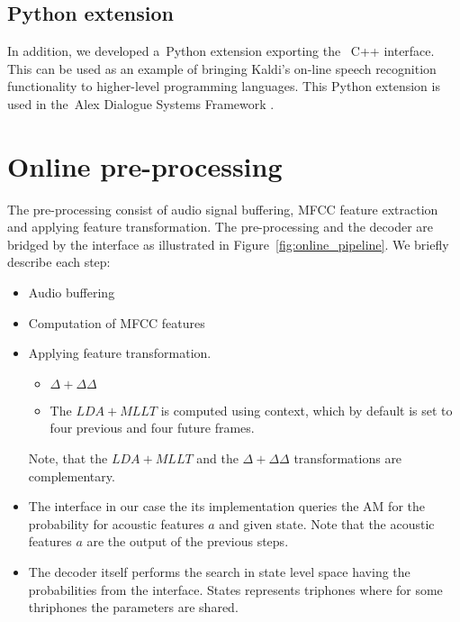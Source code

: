\subsection{Python extension}



In addition, we developed a~Python extension exporting the~ C++ interface.
This can be used as an example of bringing Kaldi's on-line speech recognition functionality to higher-level programming languages.
This Python extension is used in the~Alex Dialogue Systems Framework \cite{asdf2014url}.

\section{Online pre-processing} 
\label{sec:onl_preprocess}
The pre-processing consist of audio signal buffering, \ac{MFCC} feature extraction and
applying feature transformation. 
The pre-processing and the decoder are bridged by the  
interface as illustrated in Figure~\ref{fig:online_pipeline}.
We briefly describe each step:
\begin{itemize}
    \item Audio buffering
    \item Computation of \ac{MFCC} features
    \item Applying feature transformation. 
        \begin{itemize}
            \item $\Delta + \Delta\Delta$ 
            \item The $LDA+MLLT$ is computed using context,
                which by default is set to four previous and four future frames.
        \end{itemize}
        Note, that the $LDA+MLLT$ and the $\Delta+\Delta\Delta$ transformations are complementary.
    \item The \/ interface in our case the its \/ implementation
        queries the \ac{AM} for the probability for acoustic features $a$ and given state.
        Note that the acoustic features $a$ are the output of the previous steps.
    \item The decoder itself performs the search in state level space 
        having the probabilities from the \/ interface. 
        States represents triphones where for some thriphones the parameters are shared.
\end{itemize}

